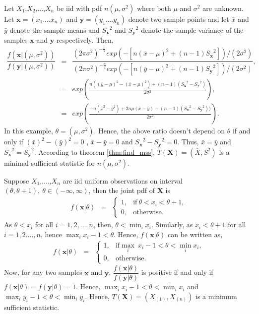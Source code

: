 \documentclass[a4paper,english,12pt]{article}
\newcommand{\bx}{\mathbf{x}}
\newcommand{\by}{\mathbf{y}}
\newcommand{\bX}{\mathbf{X}}
\begin{document}
\begin{exmp}
Let $X_1$,$X_2$,...,$X_n$ be iid with pdf $n(\mu,\sigma^2)$ where both $\mu$ and $\sigma^2$ are unknown. Let $\bx=(x_1....x_n)$ and $\by=(y_1....y_n)$ denote two sample points and let $\bar{x}$ and $\bar{y}$ denote the sample means and ${S_\bx}^2$ and ${S_\by}^2$ denote the sample variance of the samples $\bx$ and $\by$ respectively. Then,
\begin{eqnarray}
\dfrac{f(\bx|(\mu,\sigma^2))}{f(\by|(\mu,\sigma^2))} &=& \dfrac{(2\pi\sigma^2)^{-\tfrac{n}{2}}exp(-[n(\bar{x}-\mu)^2 + (n-1){S_{\bx}}^2])/(2\sigma^2)}{(2\pi\sigma^2)^{-\tfrac{n}{2}}exp(-[n(\bar{y}-\mu)^2 + (n-1){S_{\by}}^2])/(2\sigma^2)},\\
&=&exp\left(\frac{n((\bar{y}-\mu)^2-(\bar{x}-\mu)^2)+(n-1)({S_{\bx}}^2-{S_{\by}}^2)}{2\sigma^2}\right),\\
&=&exp\left(\frac{-n(\bar{x}^2-\bar{y}^2)+2n\mu(\bar{x}-\bar{y})-(n-1)({S_{\bx}}^2-{S_{\by}}^2))}{2\sigma^2}\right).
\end{eqnarray}
In this example, $\theta = (\mu,\sigma^2)$. Hence, the above ratio doesn't depend on $\theta$ if and only if $(\bar{x})^2 - (\bar{y})^2 = 0$ , $\bar{x} - \bar{y} = 0$ and ${S_{\bx}}^2-{S_{\by}}^2 = 0$. Thus, $\bar{x} = \bar{y}$ and ${S_{\bx}}^2 = {S_{\by}}^2$. According to theorem \ref{thm:find_mss}, $T(\bX) = (\bar{X},S^2)$ is a minimal sufficient statistic for $n(\mu,\sigma^2)$.
\end{exmp}

\begin{exmp}
Suppose $X_1$,....,$X_n$ are iid uniform observations on interval $(\theta,\theta+1), ~\theta\in(-\infty,\infty)$, then the joint pdf of $\bX$ is
\begin{eqnarray}
f(\bx|\theta) &=&
\begin{cases}
1, &\mbox{if}~ \theta<x_i<\theta+1,\\
0, &\mbox{otherwise}.
\end{cases}
\end{eqnarray}
As $\theta<x_i$ for all $i=1,2,...,n$, then, $\theta<\displaystyle\min_i x_i$. Similarly, as $x_i<\theta+1$ for all $i=1,2....,n$, hence $\displaystyle\max_i x_i - 1 < \theta$. Hence, $f(\bx|\theta)$ can be written as,
\begin{eqnarray}
f(\bx|\theta) &=&
\begin{cases}
1, &\mbox{if} \displaystyle\max_i~ x_i - 1 < \theta < \displaystyle\min_i x_i,\\
0, &\mbox{otherwise}.
\end{cases}
\end{eqnarray}
Now, for any two samples $\bx$ and $\by$, $\dfrac{f(\bx|\theta)}{f(\by|\theta)}$ is positive if and only if $f(\bx|\theta) = f(\by|\theta) = 1 $. Hence, $\displaystyle\max_i x_i - 1 < \theta < \displaystyle\min_i x_i$ and $\displaystyle\max_i y_i - 1 < \theta < \displaystyle\min_i y_i$.
Hence, $T(\bX)=(X_{(1)},X_{(n)})$ is a minimum sufficient statistic.
\end{exmp}
\end{document}
